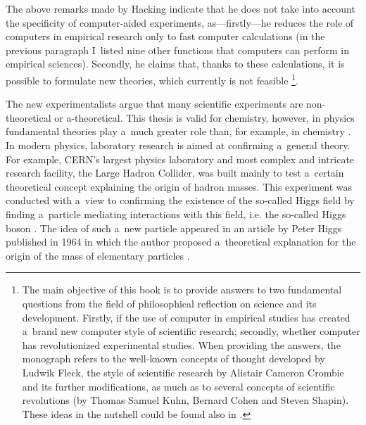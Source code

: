 The above remarks made by Hacking indicate that he does not take into account the specificity of computer-aided experiments, as---firstly---he reduces the role of computers in empirical research only to fast computer calculations (in the previous paragraph I~listed nine other functions that computers can perform in empirical sciences). Secondly, he claims that, thanks to these calculations, it is possible to formulate new theories, which currently is not feasible 
\parencite[][pp.86–93]{leciejewski_cyfrowa_2013}%
\footnote{The main objective of this book is to provide answers to two fundamental questions from the field of philosophical reflection on science and its development. Firstly, if the use of computer in empirical studies has created a~brand new computer style of scientific research; secondly, whether computer has revolutionized experimental studies. When providing the answers, the monograph refers to the well-known concepts of thought developed by Ludwik Fleck, the style of scientific research by Alistair Cameron Crombie and its further modifications, as much as to several concepts of scientific revolutions (by Thomas Samuel Kuhn, Bernard Cohen and Steven Shapin). These ideas in the nutshell could be found also in 
\parencite[][]{leciejewski_struktura_2018}.%
}.



The new experimentalists argue that many scientific experiments are non-theoretical or a-theoretical. This thesis is valid for chemistry, however, in physics fundamental theories play a~much greater role than, for example, in chemistry 
\parencite[][]{zeidler_idea_1995}. %
 In modern physics, laboratory research is aimed at confirming a~general theory. For example, CERN's largest physics laboratory and most complex and intricate research facility, the Large Hadron Collider, was built mainly to test a~certain theoretical concept explaining the origin of hadron masses. This experiment was conducted with a~view to confirming the existence of the so-called Higgs field by finding a~particle mediating interactions with this field, i.e. the so-called Higgs boson 
\parencite[][]{bhat_observation_2013}. %
 The idea of such a~new particle appeared in an article by Peter Higgs published in 1964 in which the author proposed a~theoretical explanation for the origin of the mass of elementary particles 
\parencite[][]{higgs_broken_1964}.%




